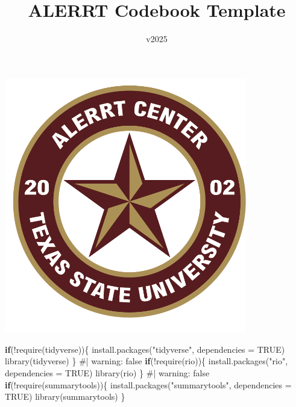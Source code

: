 \documentclass[
  letterpaper,
  DIV=11,
  numbers=noendperiod]{scrartcl}
\title{ALERRT Codebook Template}
\subtitle{v2025}
\author{}
\date{}
\newenvironment{Shaded}{\begin{snugshade}}{\end{snugshade}}
\newcommand{\AttributeTok}[1]{\textcolor[rgb]{0.40,0.45,0.13}{#1}}
\newcommand{\CommentTok}[1]{\textcolor[rgb]{0.37,0.37,0.37}{#1}}
\newcommand{\ConstantTok}[1]{\textcolor[rgb]{0.56,0.35,0.01}{#1}}
\newcommand{\ControlFlowTok}[1]{\textcolor[rgb]{0.00,0.23,0.31}{\textbf{#1}}}
\newcommand{\FunctionTok}[1]{\textcolor[rgb]{0.28,0.35,0.67}{#1}}
\newcommand{\NormalTok}[1]{\textcolor[rgb]{0.00,0.23,0.31}{#1}}
\newcommand{\SpecialCharTok}[1]{\textcolor[rgb]{0.37,0.37,0.37}{#1}}
\newcommand{\StringTok}[1]{\textcolor[rgb]{0.13,0.47,0.30}{#1}}
\renewcommand*\contentsname{Table of contents}
\newcommand\contentsname{Table of contents}
\begin{document}
\maketitle

\renewcommand*\contentsname{Table of contents}
{
\hypersetup{linkcolor=}
\setcounter{tocdepth}{3}
\tableofcontents
}

\begin{center}
\includegraphics[width=4.16667in,height=\textheight]{ALERRT Center Badge_Logo PNG.png}
\end{center}

\begin{Shaded}
\begin{Highlighting}[]
\ControlFlowTok{if}\NormalTok{(}\SpecialCharTok{!}\FunctionTok{require}\NormalTok{(tidyverse))\{}
  \FunctionTok{install.packages}\NormalTok{(}\StringTok{"tidyverse"}\NormalTok{, }\AttributeTok{dependencies =} \ConstantTok{TRUE}\NormalTok{)}
  \FunctionTok{library}\NormalTok{(tidyverse)}
\NormalTok{\}}
\CommentTok{\#| warning: false}
\ControlFlowTok{if}\NormalTok{(}\SpecialCharTok{!}\FunctionTok{require}\NormalTok{(rio))\{}
  \FunctionTok{install.packages}\NormalTok{(}\StringTok{"rio"}\NormalTok{, }\AttributeTok{dependencies =} \ConstantTok{TRUE}\NormalTok{)}
  \FunctionTok{library}\NormalTok{(rio)}
\NormalTok{\}}
\CommentTok{\#| warning: false}
\ControlFlowTok{if}\NormalTok{(}\SpecialCharTok{!}\FunctionTok{require}\NormalTok{(summarytools))\{}
  \FunctionTok{install.packages}\NormalTok{(}\StringTok{"summarytools"}\NormalTok{, }\AttributeTok{dependencies =} \ConstantTok{TRUE}\NormalTok{)}
  \FunctionTok{library}\NormalTok{(summarytools)}
\NormalTok{\}}
\end{Highlighting}
\end{Shaded}
\end{document}
